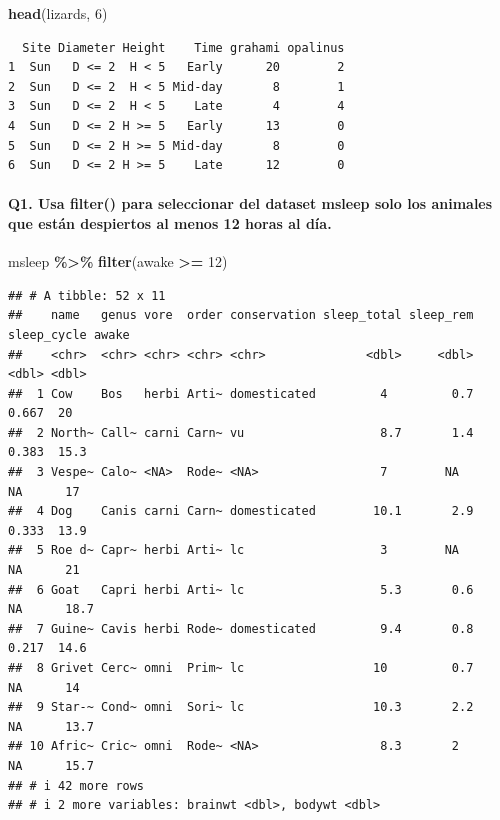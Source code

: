 \documentclass[
]{article}
\newenvironment{Shaded}{\begin{snugshade}}{\end{snugshade}}
\newcommand{\DecValTok}[1]{\textcolor[rgb]{0.00,0.00,0.81}{#1}}
\newcommand{\FunctionTok}[1]{\textcolor[rgb]{0.13,0.29,0.53}{\textbf{#1}}}
\newcommand{\NormalTok}[1]{#1}
\newcommand{\SpecialCharTok}[1]{\textcolor[rgb]{0.81,0.36,0.00}{\textbf{#1}}}
\begin{document}
\begin{Shaded}
\begin{Highlighting}[]
\FunctionTok{head}\NormalTok{(lizards, }\DecValTok{6}\NormalTok{)}
\end{Highlighting}
\end{Shaded}

\begin{verbatim}
  Site Diameter Height    Time grahami opalinus
1  Sun   D <= 2  H < 5   Early      20        2
2  Sun   D <= 2  H < 5 Mid-day       8        1
3  Sun   D <= 2  H < 5    Late       4        4
4  Sun   D <= 2 H >= 5   Early      13        0
5  Sun   D <= 2 H >= 5 Mid-day       8        0
6  Sun   D <= 2 H >= 5    Late      12        0
\end{verbatim}

\paragraph{Q1. Usa filter() para seleccionar del dataset msleep solo los
animales que están despiertos al menos 12 horas al
día.}\label{q1.-usa-filter-para-seleccionar-del-dataset-msleep-solo-los-animales-que-estuxe1n-despiertos-al-menos-12-horas-al-duxeda.}

\begin{Shaded}
\begin{Highlighting}[]
\NormalTok{msleep }\SpecialCharTok{\%\textgreater{}\%}
  \FunctionTok{filter}\NormalTok{(awake }\SpecialCharTok{\textgreater{}=} \DecValTok{12}\NormalTok{)}
\end{Highlighting}
\end{Shaded}

\begin{verbatim}
## # A tibble: 52 x 11
##    name   genus vore  order conservation sleep_total sleep_rem sleep_cycle awake
##    <chr>  <chr> <chr> <chr> <chr>              <dbl>     <dbl>       <dbl> <dbl>
##  1 Cow    Bos   herbi Arti~ domesticated         4         0.7       0.667  20  
##  2 North~ Call~ carni Carn~ vu                   8.7       1.4       0.383  15.3
##  3 Vespe~ Calo~ <NA>  Rode~ <NA>                 7        NA        NA      17  
##  4 Dog    Canis carni Carn~ domesticated        10.1       2.9       0.333  13.9
##  5 Roe d~ Capr~ herbi Arti~ lc                   3        NA        NA      21  
##  6 Goat   Capri herbi Arti~ lc                   5.3       0.6      NA      18.7
##  7 Guine~ Cavis herbi Rode~ domesticated         9.4       0.8       0.217  14.6
##  8 Grivet Cerc~ omni  Prim~ lc                  10         0.7      NA      14  
##  9 Star-~ Cond~ omni  Sori~ lc                  10.3       2.2      NA      13.7
## 10 Afric~ Cric~ omni  Rode~ <NA>                 8.3       2        NA      15.7
## # i 42 more rows
## # i 2 more variables: brainwt <dbl>, bodywt <dbl>
\end{verbatim}
\end{document}
